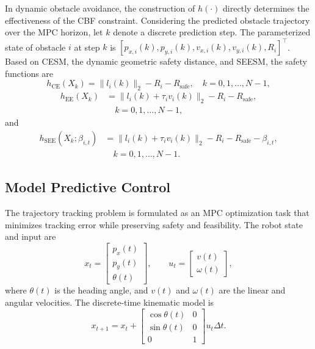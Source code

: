 \documentclass[journal]{IEEEtranTIE}
\begin{document}
    In dynamic obstacle avoidance, the construction of $h(\cdot)$ directly
    determines the effectiveness of the CBF constraint. Considering the predicted
    obstacle trajectory over the MPC horizon, let $k$ denote a discrete prediction
    step. The parameterized state of obstacle $i$ at step $k$ is
    $[p_{x,i}(k),p_{y,i}(k),v_{x,i}(k),v_{y,i}(k),R_i]^\top$. Based on CESM, the
    dynamic geometric safety distance, and SEESM, the safety functions are
    \begin{equation}
    h_{\mathrm{CE}}(X_k)
    =
    \|l_i(k)\|_2-R_i-R_{\mathrm{safe}},
    \quad k=0,1,\ldots,N-1,
    \end{equation}
    \begin{equation}
    \begin{aligned}
    h_{\mathrm{EE}}(X_k)
    &=
    \|l_i(k)+\tau_i v_i(k)\|_2-R_i-R_{\mathrm{safe}},\\
    &\quad k=0,1,\ldots,N-1,
    \end{aligned}
    \end{equation}
    and
    \begin{equation}
    \begin{aligned}
    h_{\mathrm{SEE}}(X_k;\beta_{i,t})
    &=
    \|l_i(k)+\tau_i v_i(k)\|_2
    -R_i-R_{\mathrm{safe}}-\beta_{i,t},\\
    &\quad k=0,1,\ldots,N-1.
    \end{aligned}
    \end{equation}

    \subsection{Model Predictive Control}
    The trajectory tracking problem is formulated as an MPC optimization task
    that minimizes tracking error while preserving safety and feasibility. The
    robot state and input are
    \begin{equation}
    x_t=
    \begin{bmatrix}
    p_x(t)\\p_y(t)\\\theta(t)
    \end{bmatrix},
    \qquad
    u_t=
    \begin{bmatrix}
    v(t)\\\omega(t)
    \end{bmatrix},
    \end{equation}
    where $\theta(t)$ is the heading angle, and $v(t)$ and $\omega(t)$ are the
    linear and angular velocities. The discrete-time kinematic model is
    \begin{equation}
    x_{t+1}=x_t+
    \begin{bmatrix}
    \cos\theta(t)&0\\
    \sin\theta(t)&0\\
    0&1
    \end{bmatrix}
    u_t\Delta t.
    \end{equation}
\end{document}
